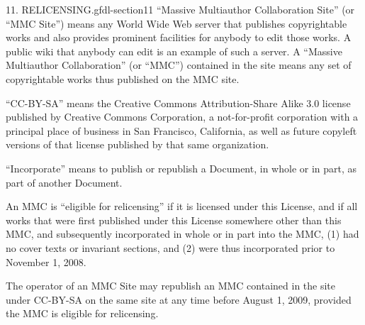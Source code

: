 \documentclass[10pt,]{book}
\numberwithin{equation}{section}
\begin{document}
\begin{paragraphs}{11. RELICENSING.}{gfdl-section11}%
\hypertarget{p-1581}{}%
``Massive Multiauthor Collaboration Site'' (or ``MMC Site'') means any World Wide Web server that publishes copyrightable works and also provides prominent facilities for anybody to edit those works. A public wiki that anybody can edit is an example of such a server. A ``Massive Multiauthor Collaboration'' (or ``MMC'') contained in the site means any set of copyrightable works thus published on the MMC site.%
\par
\hypertarget{p-1582}{}%
``CC-BY-SA'' means the Creative Commons Attribution-Share Alike 3.0 license published by Creative Commons Corporation, a not-for-profit corporation with a principal place of business in San Francisco, California, as well as future copyleft versions of that license published by that same organization.%
\par
\hypertarget{p-1583}{}%
``Incorporate'' means to publish or republish a Document, in whole or in part, as part of another Document.%
\par
\hypertarget{p-1584}{}%
An MMC is ``eligible for relicensing'' if it is licensed under this License, and if all works that were first published under this License somewhere other than this MMC, and subsequently incorporated in whole or in part into the MMC, (1) had no cover texts or invariant sections, and (2) were thus incorporated prior to November 1, 2008.%
\par
\hypertarget{p-1585}{}%
The operator of an MMC Site may republish an MMC contained in the site under CC-BY-SA on the same site at any time before August 1, 2009, provided the MMC is eligible for relicensing.%
\end{paragraphs}%
\end{document}
